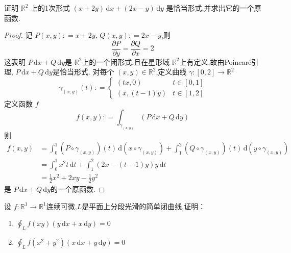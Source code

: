 \documentclass[lang=cn,12pt,color=green,fontset=none,thmcnt=section]{elegantbook}
\begin{document}
\begin{exercise}
    证明 $ \mathbb{R} ^{2} $ 上的1次形式 $ \left( x+ 2y \right)\,\mathrm{d} x+  \left( 2x -y \right)\,\mathrm{d} y   $ 是恰当形式,并求出它的一个原函数.
\end{exercise}
\begin{proof}
    记 $ P\left( x,y \right): = x+ 2y  $, $ Q\left( x,y \right): = 2x-y  $,则 $$
    \frac{\partial P}{\partial y} = \frac{\partial Q}{\partial x} = 2
    $$  这表明 $ P\,\mathrm{d} x+ Q\,\mathrm{d} y $是 $ \mathbb{R} ^{2} $上的一个闭形式,且在星形域 $ \mathbb{R} ^{2} $上有定义,故由Poincaré引理, $ P\,\mathrm{d} x+ Q\,\mathrm{d} y $是恰当形式.
    对每个 $ \left( x,y \right)  \in \mathbb{R} ^{2} $,定义曲线 $ \gamma: [0,2]\to  \mathbb{R} ^{2} $  $$
    \gamma_{\left( x,y \right) }\left( t \right) :  = \begin{cases} \left( tx,0 \right)& t \in \left[ 0,1 \right]\\ 
    \left( x,\left( t-1 \right)y  \right)& t \in [1,2]    \end{cases}
    $$  定义函数 $ f $   $$
    f\left( x,y \right): =  \int_{\gamma_{\left( x,y \right) }} \left( P \,\mathrm{d} x+ Q\,\mathrm{d} y \right) 
    $$ 则 $$
    \begin{aligned}
        f\left( x,y \right) &= \int_{0}^{1}\left(  P\circ \gamma_{\left( x,y \right) }  \right)\left( t \right)  \,\mathrm{d} \left( x\circ \gamma_{\left( x,y \right) } \right)   + \int_{1}^{2} \left( Q\circ \gamma_{\left( x,y \right) }\right)\left( t \right) \,\mathrm{d} \left( y\circ \gamma_{\left( x,y \right) } \right) \\ 
          & = \int_{0}^{1}x^{2}t\,\mathrm{d} t +  \int_{1}^{2} \left( 2x- \left( t-1 \right)y  \right) y\,\mathrm{d} t\\ 
           & = \frac{1}{2}x^{2}+ 2xy- \frac{1}{2}y^{2}
    \end{aligned}   
    $$是 $ P\,\mathrm{d} x+ Q\,\mathrm{d} y $的一个原函数. 
    
\end{proof}

\begin{exercise}
    设 $ f:\mathbb{R} ^{1}\to \mathbb{R} ^{1} $连续可微,$ L $是平面上分段光滑的简单闭曲线,证明：
    \begin{enumerate}
        \item  $ \oint_{L}f\left( xy \right) \left( y\,\mathrm{d} x+  x \,\mathrm{d} y \right) = 0   $ 
        \item  $ \oint_{L}f\left( x^{2}+ y^{2} \right) \left( x \,\mathrm{d} x+  y\,\mathrm{d} y \right)   = 0 $ 
    \end{enumerate}
    
    
\end{exercise}
\end{document}
